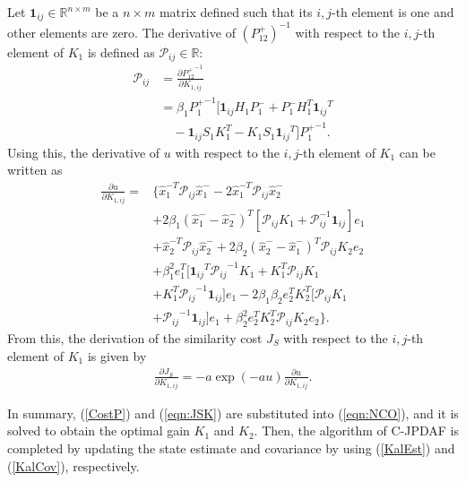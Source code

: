 \documentclass[letterpaper, 10pt, conference]{ieeeconf}
\newcommand{\refeqn}[1]{(\ref{eqn:#1})}
\renewcommand{\Re}{\ensuremath{\mathbb{R}}}
\begin{document}

\newcommand{\Iij}{\ensuremath{\mathbf{1}_{ij}}}

Let $\Iij\in \Re^{n\times m}$ be a $n\times m$ matrix defined such that its $i,j$-th element is one and other elements are zero. The derivative of $(P_{12}^+)^{-1}$ with respect to the $i,j$-th element of $K_1$ is defined as $\mathcal{P}_{ij}\in\Re$:
\begin{align}
\mathcal{P}_{ij}&=\frac{\partial {P^+_{12}}^{-1}}{\partial K_{1,ij}}\nonumber\\
&=\beta_1{P_1^+}^{-1}[\Iij H_1P_1^-+P_1^-H_1^T\Iij^T\nonumber\\
&\quad -\Iij S_1K_1^T -K_1S_1\Iij^T]{P_1^+}^{-1}.
\end{align}
Using this, the derivative of $u$ with respect to the $i,j$-th element of $K_1$ can be written as
\begin{align}
\frac{\partial u}{\partial K_{1,ij}}%
=& \{\hat x_1^{-T}\mathcal{P}_{ij}\hat x_1^-
-2\hat x_1^{-T}\mathcal{P}_{ij}\hat x_2^-\nonumber\\
&+2\beta_1(\hat x_1^{-}-\hat x_2^{-})^T[\mathcal{P}_{ij}K_1+\mathcal{P}_{ij}^{-1}\Iij]e_1\nonumber\\
&+\hat x_2^{-T}\mathcal{P}_{ij}\hat x_2^-+2\beta_2(\hat x_2^{-}-\hat x_1^{-})^T\mathcal{P}_{ij}K_2e_2\nonumber\\
&+\beta_1^2e_1^T[\Iij^T{\mathcal{P}_{ij}}^{-1}K_1+K_1^T\mathcal{P}_{ij}K_1\nonumber\\
&+K_1^T{\mathcal{P}_{ij}}^{-1}\Iij]e_1-2\beta_1\beta_2e_2^TK_2^T[\mathcal{P}_{ij}K_1\nonumber\\
&+{\mathcal{P}_{ij}}^{-1}\Iij]e_1+\beta_2^2e_2^TK_2^T\mathcal{P}_{ij}K_2e_2\}.
\end{align}
From this, the derivation of the similarity cost $J_S$ with respect to the $i,j$-th element of $K_1$ is given by
\begin{align}
\frac{\partial J_{S}}{\partial K_{1,ij}}=-a\exp(-au)\frac{\partial u}{\partial K_{1,ij}}.\label{eqn:JSK}
\end{align}

In summary, (\ref{CostP}) and \refeqn{JSK} are substituted into \refeqn{NCO}, and it is solved to obtain the optimal gain $K_1$ and $K_2$. Then, the algorithm of C-JPDAF is completed by updating the state estimate and covariance by using (\ref{KalEst}) and (\ref{KalCov}), respectively. 
\end{document}
